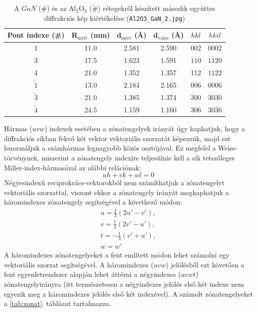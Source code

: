 \documentclass[12pt,a4paper]{article}
\begin{document}
\begin{table}[!h]
\begin{center}
\begin{tabular}{|c|c|c|c|c|c|}
\hline
Pont indexe (\#) & R$_{\textrm{mért}}$ (mm) & d$_{\textrm{mért}}$ (\AA) & d$_{\textrm{valós}}$ (\AA) & $hkl$ & $hkil$ \\
\hline
1 & 11.0 & 2.581 & 2.590 & 002 & 0002 \\
\hline
3 & 17.5 & 1.623 & 1.591 & $\overline{1}\overline{1}0$ & $\overline{1}\overline{1}20$ \\
\hline
4 & 21.0 & 1.352 & 1.357 & 112 & $11\overline{2}2$\\
\hline
\hline
$\widetilde{1}$ & 13.0 & 2.184 & 2.165 & 006 & 0006\\
\hline
$\widetilde{3}$ & 21.0 & 1.385 & 1.374 & $\overline{3}00$ & $\overline{3}030$\\
\hline
$\widetilde{4}$ & 24.5 & 1.159 & 1.160 & 306 & 30$\overline{3}6$\\
\hline
\end{tabular}
\caption{A $GaN$ (\#) és az Al$_2$O$_3$ ($\widetilde{\#}$) rétegekről készített második együttes diffrakciós kép kiértékelése (\texttt{Al2O3\_GaN\_2.jpg})}
\end{center}
\end{table}
\newpage
\hspace*{10pt} Hármas ($uvw$) indexek esetében a zónatengelyek irányát úgy kaphatjuk, hogy a diffrakciós síkban fekvő két vektor vektoriális szorzatát képezzük, majd ezt lenormáljuk a számhármas legnagyobb közös osztójával. Ez megfelel a Weiss-törvénynek, miszerint a zónatengely indexire teljesülnie kell a sík tetszőleges Miller-index-hármasával az alábbi relációnak:
\begin{equation}
uh+vk+wl=0
\end{equation}
Négyesindexű reciprokrács-vektorokból nem számíthatjuk a zónatengelyt vektoriális szorzattal, viszont ekkor a zónatengely irányát megkaphatjuk a háromindexes zónatengely segítségével a következő módon:
\begin{equation}
\begin{split}
u = \frac{1}{3}(2u' - v'),\\
v = \frac{1}{3}(2v' - u'),\\
t = -\frac{1}{3}(v' + u'),\\
w = w'
\end{split}
\end{equation}
A háromindexes zónatengelyeket a fent említett módon lehet számolni egy vektoriális szorzat segítségével. A háromindexes ($uvw$) jelölésből ezt követően a fent egyenletrendszer alapján lehet áttérni a négyindexes ($uvwt$) zónatengelyirányra (itt természetesen a négyindexes jelölés első két indexe nem egyezik meg a háromindexes jelölés első két indexével). A számolt zónatengelyeket a \ref{tab:zonat}. táblázat tartalmazza.\\
\end{document}
